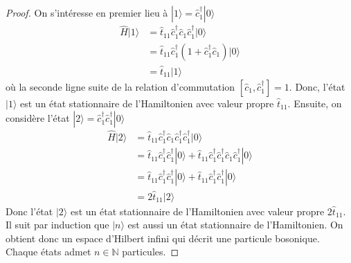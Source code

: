 \documentclass{article}
\numberwithin{equation}{section}
\theoremstyle{solution}
\begin{document}
\begin{proof}
On s'intéresse en premier lieu à $| 1 \rangle = \hat{c}^{\dagger}_1 | 0 \rangle $
\begin{align*}
        \hat{H}| 1 \rangle &= \hat{t}_{11} \hat{c}^{\dagger}_1 \hat{c}_1 \hat{c}^{\dagger}_1 | 0 \rangle \\
        &= \hat{t}_{11} \hat{c}^{\dagger}_1 (1 + \hat{c}^{\dagger}_1 \hat{c}_1)| 0 \rangle \\
        &= \hat{t}_{11}| 1 \rangle 
\end{align*}
où la seconde ligne suite de la relation d'commutation $[\hat{c}_1, \hat{c}^{\dagger}_1] = 1$.
Donc, l'état $| 1 \rangle $ est un état stationnaire de l'Hamiltonien avec valeur propre $\hat{t}_{11}$. 
Ensuite, on considère l'état $| 2 \rangle = \hat{c}^{\dagger}_1 \hat{c}^{\dagger}_1 | 0 \rangle $
\begin{align*}
        \hat{H} | 2 \rangle &= \hat{t}_{11} \hat{c}^{\dagger}_1 \hat{c}_1 \hat{c}^{\dagger}_1 \hat{c}^{\dagger}_1 | 0 \rangle  \\
                &= \hat{t}_{11}\hat{c}^{\dagger}_1\hat{c}^{\dagger}_1 | 0 \rangle  + \hat{t}_{11}\hat{c}^{\dagger}_1\hat{c}^{\dagger}_1 \hat{c}_1\hat{c}^{\dagger}_1 | 0 \rangle  \\
                &= \hat{t}_{11}\hat{c}^{\dagger}_1\hat{c}^{\dagger}_1 | 0 \rangle  + \hat{t}_{11}\hat{c}^{\dagger}_1\hat{c}^{\dagger}_1 | 0 \rangle  \\
                &= 2\hat{t}_{11}| 2 \rangle 
\end{align*}
Donc l'état $| 2 \rangle $ est un état stationnaire de l'Hamiltonien avec valeur propre $2 \hat{t}_{11}$. Il suit par 
induction que $| n \rangle $ est aussi un état stationnaire de l'Hamiltonien. On obtient donc un espace d'Hilbert 
infini qui décrit une particule bosonique. Chaque états admet $n \in \mathbb{N}$ particules.
\end{proof}
\end{document}
